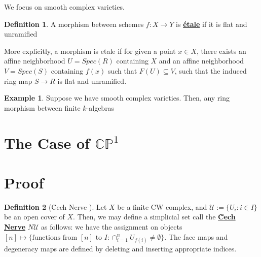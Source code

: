 \documentclass{article}
\theoremstyle{definition}
\theoremstyle{definition}
\newtheorem{definition}{Definition}[theorem]
\theoremstyle{definition}
\theoremstyle{definition}
\theoremstyle{definition}
\theoremstyle{definition}
\theoremstyle{definition}
\newtheorem{example}{Example}[theorem]
\begin{document}
We focus on smooth complex varieties.
\begin{tcolorbox}[colback=purple!5!white,colframe=purple!75!black]
\begin{definition}
A morphism between schemes $f: X\to Y$ is \underline{\textbf{\'etale}} if it is flat and unramified 
\end{definition}
\end{tcolorbox}
More explicitly, a morphism is etale if for given a point $x\in X$, there exists an affine neighborhood $U=Spec(R)$ containing $X$ and an affine neighborhood $V=Spec(S)$ containing $f(x)$ such that $F(U)\subseteq V$, such that the induced ring map $S\to R$ is flat and unramified. 


\begin{tcolorbox}[colback=yellow!5!white,colframe=yellow!30!white]
\begin{example}
Suppose we have smooth complex varieties. Then, any ring morphism between finite $k$-algebras
\end{example}
\end{tcolorbox}








\section{The Case of $\mathbb{CP}^1$}

\section{Proof}





















\begin{tcolorbox}[colback=purple!5!white,colframe=purple!75!black]
\begin{definition}[\u Cech Nerve ]
Let $X$ be a finite CW complex, and $\mathcal{U}:=\{U_i: i\in I\}$ be an open cover of $X$. Then, we may define a simplicial set call the \underline{\textbf{\u Cech Nerve}} $N \mathcal{U}$ as follows: we have the assignment on objects $[n]\mapsto \{\textrm{functions from }[n] \textrm{ to } I: \cap^n_{i=1}U_{f(i)}\neq \emptyset \}$. The face maps and degeneracy maps are defined by deleting and inserting appropriate indices. 
\end{definition}
\end{tcolorbox}
\end{document}
